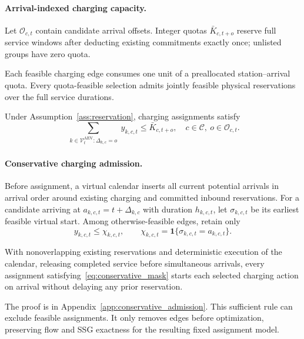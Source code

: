 \paragraph{Arrival-indexed charging capacity.}
Let $\mathcal O_{c,t}$ contain candidate arrival offsets. Integer quotas
$\bar K_{c,t+o}$ reserve full service windows after deducting existing
commitments exactly once; unlisted groups have zero quota.

\begin{assumption}
\label{ass:reservation}
Each feasible charging edge consumes one unit of a preallocated
station--arrival quota. Every quota-feasible selection admits jointly
feasible physical reservations over the full service durations.
\end{assumption}

Under Assumption~\ref{ass:reservation}, charging assignments satisfy
\begin{equation}
\sum_{\substack{k\in\mathcal V_t^{\mathrm{AEV}}:\Delta_{k,c}=o}}
 y_{k,c,t}\le \bar K_{c,t+o},
\quad c\in\mathcal C,\ o\in\mathcal O_{c,t}.
\label{eq:station-cap}
\end{equation}
\paragraph{Conservative charging admission.}
Before assignment, a virtual calendar inserts all current potential
arrivals in arrival order around existing charging and committed inbound
reservations. For a candidate arriving at $a_{k,c,t}=t+\Delta_{k,c}$
with duration $h_{k,c,t}$, let $\sigma_{k,c,t}$ be its earliest feasible
virtual start. Among otherwise-feasible edges, retain only
\begin{equation}
y_{k,c,t}\le\chi_{k,c,t},\qquad
\chi_{k,c,t}=\mathbf1\{\sigma_{k,c,t}=a_{k,c,t}\}.
\label{eq:conservative_mask}
\end{equation}
\begin{proposition}
\label{prop:conservative_queue_safety}
With nonoverlapping existing reservations and deterministic execution
of the calendar, releasing completed service before simultaneous arrivals,
every assignment satisfying~\eqref{eq:conservative_mask} starts each
selected charging action on arrival without delaying any prior reservation.
\end{proposition}
The proof is in Appendix~\ref{app:conservative_admission}.
This sufficient rule can exclude feasible assignments. It only removes
edges before optimization, preserving flow and SSG exactness for the
resulting fixed assignment model.

